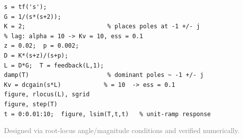 \documentclass[11pt]{article}
\begin{document}
\begin{lstlisting}[style=matlab,caption={Problem 28 --- MATLAB}]
s = tf('s');
G = 1/(s*(s+2));
K = 2;                       % places poles at -1 +/- j
% lag: alpha = 10 -> Kv = 10, ess = 0.1
z = 0.02;  p = 0.002;
D = K*(s+z)/(s+p);
L = D*G;  T = feedback(L,1);
damp(T)                      % dominant poles ~ -1 +/- j
Kv = dcgain(s*L)            % = 10  -> ess = 0.1
figure, rlocus(L), sgrid
figure, step(T)
t = 0:0.01:10;  figure, lsim(T,t,t)   % unit-ramp response
\end{lstlisting}

\vfill
\begin{center}\small\textcolor{gray}{Designed via root-locus angle/magnitude conditions and verified numerically.}\end{center}
\end{document}
